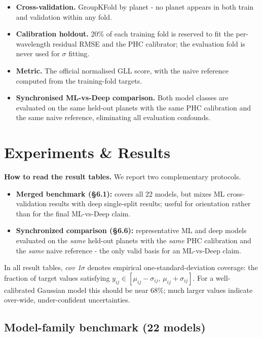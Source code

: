 \documentclass[12pt]{article}
\begin{document}
\begin{itemize}
\item \textbf{Cross-validation.} GroupKFold by planet - no planet appears in both train and validation within any fold.
\item \textbf{Calibration holdout.} 20\% of each training fold is reserved to fit the per-wavelength residual RMSE and the PHC calibrator; the evaluation fold is never used for $\sigma$ fitting.
\item \textbf{Metric.} The official normalised GLL score, with the naive reference computed from the training-fold targets.
\item \textbf{Synchronised ML-vs-Deep comparison.} Both model classes are evaluated on the same held-out planets with the same PHC calibration and the same naive reference, eliminating all evaluation confounds.
\end{itemize}

\section{Experiments \& Results}

\textbf{How to read the result tables.} We report two complementary protocols.

\begin{itemize}
\item \textbf{Merged benchmark (\S{}6.1):} covers all 22 models, but mixes ML cross-validation results with deep single-split results; useful for orientation rather than for the final ML-vs-Deep claim.
\item \textbf{Synchronized comparison (\S{}6.6):} representative ML and deep models evaluated on the \emph{same} held-out planets with the \emph{same} PHC calibration and the \emph{same} naive reference - the only valid basis for an ML-vs-Deep claim.
\end{itemize}

In all result tables, \emph{cov 1$\sigma$} denotes empirical one-standard-deviation coverage: the fraction of target values satisfying $y_{ij}\in[\mu_{ij}-\sigma_{ij},\,\mu_{ij}+\sigma_{ij}]$. For a well-calibrated Gaussian model this should be near 68\%; much larger values indicate over-wide, under-confident uncertainties.

\subsection{Model-family benchmark (22 models)}
\end{document}
